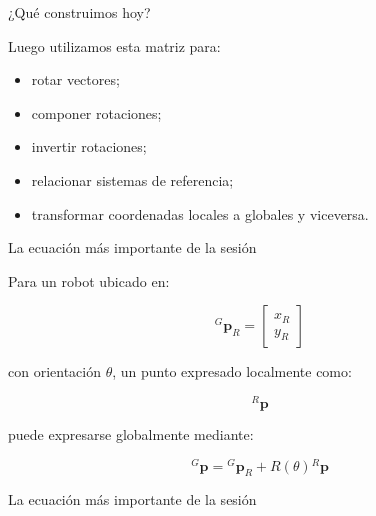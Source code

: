 \documentclass[aspectratio=169]{beamer}
\begin{document}
\begin{frame}{¿Qué construimos hoy?}

    Luego utilizamos esta matriz para:

    \begin{itemize}
        \item rotar vectores;
        \item componer rotaciones;
        \item invertir rotaciones;
        \item relacionar sistemas de referencia;
        \item transformar coordenadas locales a globales y viceversa.
    \end{itemize}

\end{frame}

\begin{frame}{La ecuación más importante de la sesión}

    Para un robot ubicado en:

    \[
    {}^{G}\mathbf{p}_R
    =
    \begin{bmatrix}
        x_R\\
        y_R
    \end{bmatrix}
    \]

    con orientación $\theta$, un punto expresado localmente como:

    \[
    {}^{R}\mathbf{p}
    \]

    puede expresarse globalmente mediante:

    \[
    \boxed{
        {}^{G}\mathbf{p}
        =
        {}^{G}\mathbf{p}_R
        +
        R(\theta)
        {}^{R}\mathbf{p}
    }
    \]

\end{frame}

\begin{frame}{La ecuación más importante de la sesión}


    \vspace{0.3cm}


\end{frame}
\end{document}
